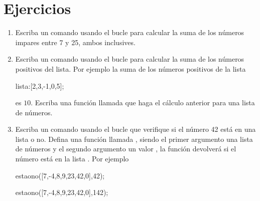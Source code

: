 
\section*{Ejercicios}

\begin{enumerate}

	\item Escriba un comando usando el bucle 
para calcular la suma de los números impares entre 7 y 25, ambos inclusives.

	\item Escriba un comando usando el bucle 
para calcular la suma de los números positivos del lista.
Por ejemplo la suma de los números positivos de la lista
\begin{maximai}
lista:[2,3,-1,0,5];
\end{maximai}
\begin{maximao}
\left[ 2 , 3 , -1 , 0 , 5 \right] 
\end{maximao}
es
$
10
$.
Escriba una función llamada  que haga el
cálculo anterior para una lista de números.

	\item Escriba un comando usando el bucle 
que verifique si el número 42 está en una lista o no.
Defina una función llamada , siendo
el primer argumento una lista de números y el segundo argumento
un valor , la función devolverá 
si el número  está en la lista .
Por ejemplo
\begin{maximai}
estaono([7,-4,8,9,23,42,0],42);
\end{maximai}
\begin{maximao}
\end{maximao}
\begin{maximai}
estaono([7,-4,8,9,23,42,0],142);
\end{maximai}
\begin{maximao}
\end{maximao}

\end{enumerate}

